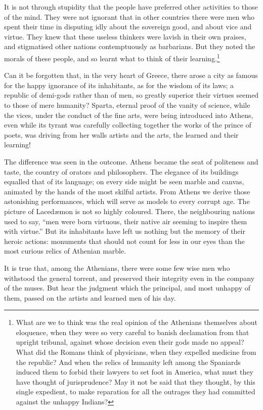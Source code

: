 It is not through stupidity that the people have preferred
other activities to those of the mind. They were not ignorant that in
other countries there were men who spent their time in disputing idly
about the sovereign good, and about vice and virtue. They knew that
these useless thinkers were lavish in their own praises, and
stigmatised other nations contemptuously as barbarians. But they noted
the morals of these people, and so learnt what to think of their
learning.\footnote{What are we to think was the real opinion of the
Athenians themselves about eloquence, when they were so very careful
to banish declamation from that upright tribunal, against whose
decision even their gods made no appeal? What did the Romans think of
physicians, when they expelled medicine from the republic? And when
the relics of humanity left among the Spaniards induced them to
forbid their lawyers to set foot in America, what must they have
thought of jurisprudence? May it not be said that they thought, by
this single expedient, to make reparation for all the outrages they
had committed against the unhappy Indians?}

Can it be forgotten that, in the very heart of Greece, there arose a
city as famous for the happy ignorance of its inhabitants, as for the
wisdom of its laws; a republic of demi-gods rather than of men, so
greatly superior their virtues seemed to those of mere humanity?
Sparta, eternal proof of the vanity of science, while the vices, under
the conduct of the fine arts, were being introduced into Athens, even
while its tyrant was carefully collecting together the works of the
prince of poets, was driving from her walls artists and the arts, the
learned and their learning!

The difference was seen in the outcome. Athens became the seat of
politeness and taste, the country of orators and philosophers. The
elegance of its buildings equalled that of its language; on every side
might be seen marble and canvas, animated by the hands of the most
skilful artists. From Athens we derive those astonishing performances,
which will serve as models to every corrupt age. The picture of
Laced\ae mon is not so highly coloured. There, the neighbouring nations
used to say, ``men were born virtuous, their native air seeming
 to inspire them with virtue.'' But its inhabitants have
left us nothing but the memory of their heroic actions: monuments that
should not count for less in our eyes than the most curious relics of
Athenian marble.

It is true that, among the Athenians, there were some few wise men who
withstood the general torrent, and preserved their integrity even in
the company of the muses. But hear the judgment which the principal,
and most unhappy of them, passed on the artists and learned men of his
day.

